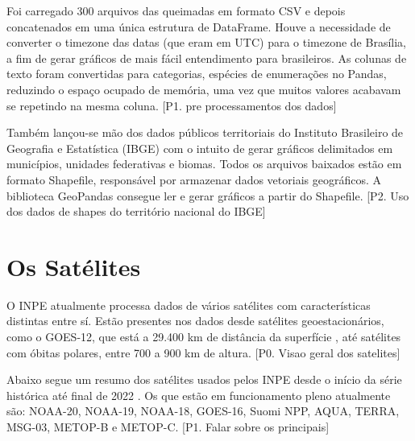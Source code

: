 \documentclass[cic,tc]{iiufrgs}
\begin{document}
Foi carregado 300 arquivos das queimadas em formato CSV e depois concatenados
em uma única estrutura de DataFrame. Houve a necessidade de converter o timezone 
das datas (que eram em UTC) para o timezone de Brasília, a fim de gerar gráficos 
de mais fácil entendimento para brasileiros. As colunas de texto foram convertidas 
para categorias, espécies de enumerações no Pandas, reduzindo o espaço ocupado 
de memória, uma vez que muitos valores acabavam se repetindo na mesma coluna. 
[P1. pre processamentos dos dados]\par

Também lançou-se mão dos dados públicos territoriais do Instituto Brasileiro de 
Geografia e Estatística (IBGE) com o intuito de gerar gráficos delimitados em 
municípios, unidades federativas e biomas. Todos os arquivos baixados estão em 
formato Shapefile, responsável por armazenar dados vetoriais geográficos. A 
biblioteca GeoPandas consegue ler e gerar gráficos a partir do Shapefile.
[P2. Uso dos dados de shapes do território nacional do IBGE] \par

\section{Os Satélites}

O INPE atualmente processa dados de vários satélites com características
distintas entre sí. Estão presentes nos dados desde satélites geoestacionários, 
como o GOES-12, que está a 29.400 km de distância da superfície 
\citep{GOES12Algo}, até satélites com óbitas polares, entre 700 a 900 km de altura.
[P0. Visao geral dos satelites] \par

Abaixo segue um resumo dos satélites usados pelos INPE desde  o início da 
série histórica até final de 2022 \cite{EmbrapaSatelites}. 
Os que estão em funcionamento pleno atualmente são:
NOAA-20, NOAA-19, NOAA-18, GOES-16, Suomi NPP, AQUA, TERRA, MSG-03, 
METOP-B e METOP-C. [P1. Falar sobre os principais]\par
\end{document}
